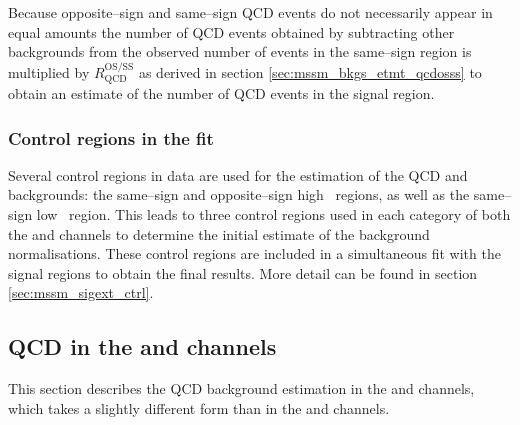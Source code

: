 Because opposite--sign and same--sign QCD events do not
necessarily appear in equal amounts the number of QCD
events obtained by subtracting other backgrounds from the
observed number of events in the same--sign region is multiplied
by $R_{\text{QCD}}^{\text{OS/SS}}$ as derived in section \ref{sec:mssm_bkgs_etmt_qcdosss} 
to obtain an estimate of the number of QCD events in the signal region.

\subsubsection{Control regions in the fit}
\label{sec:mssm_bkgs_etmt_ctrl}
Several control regions in data are used for the estimation
of the QCD and \Wjets backgrounds: the same--sign and 
opposite--sign high \mT~regions, as well as the same--sign
low \mT~region. This leads to three control regions used 
in each category of both the \mutau and \etau channels to determine
the initial estimate of the background normalisations.
These control regions are included in a simultaneous fit
with the signal regions to obtain the final results. More detail
can be found in section \ref{sec:mssm_sigext_ctrl}.


\subsection{\texorpdfstring{QCD in the \tautau and \emu channels}{QCD in the tautau and emu channels}}
\label{sec:mssm_bkgs_qcd}
This section describes the QCD background
estimation in the \tautau and \emu channels, which takes a slightly
different form than in the \mutau and \etau channels.

